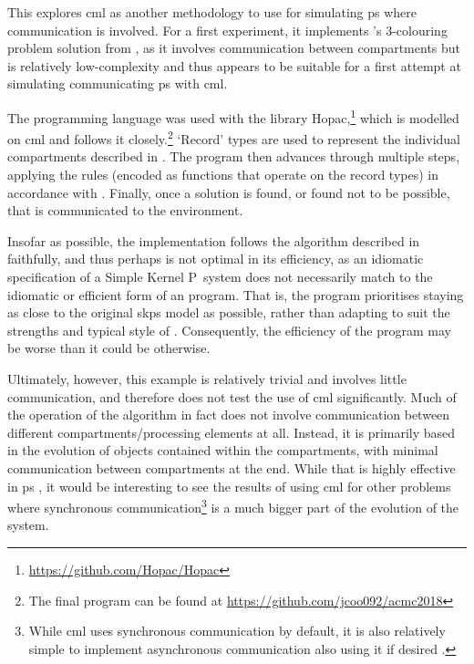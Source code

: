 
This  explores \gls{cml} as another methodology to use for simulating \gls{ps} where communication is involved.  For a first experiment, it implements \citeauthor{Gheorghe2013}'s 3-colouring problem solution from \cite{Gheorghe2013}, as it involves communication between compartments but is relatively low-complexity and thus appears to be suitable for a first attempt at simulating communicating \gls{ps} with \gls{cml}.

The programming language \fsharp{} was used with the library Hopac,\footnote{\url{https://github.com/Hopac/Hopac}} which is modelled on \gls{cml} and follows it closely.\footnote{The final program can be found at \url{https://github.com/jcoo092/acmc2018}}  `Record' types are used to represent the individual compartments described in \cite{Gheorghe2013}.  The program then advances through multiple steps, applying the rules (encoded as functions that operate on the record types) in accordance with \cite{Gheorghe2013}.  Finally, once a solution is found, or found not to be possible, that is communicated to the environment.

Insofar as possible, the implementation follows the algorithm described in \cite{Gheorghe2013} faithfully, and thus perhaps is not optimal in its efficiency, as an idiomatic specification of a Simple Kernel P~system does not necessarily match to the idiomatic or efficient form of an \fsharp{} program.  That is, the program prioritises staying as close to the original \gls{skps} model as possible, rather than adapting to suit the strengths and typical style of \fsharp{}.  Consequently, the efficiency of the program may be worse than it could be otherwise.

Ultimately, however, this example is relatively trivial and involves little communication, and therefore does not test the use of \gls{cml} significantly.  Much of the operation of the algorithm in fact does not involve communication between different compartments/processing elements at all.  Instead, it is primarily based in the evolution of objects contained within the compartments, with minimal communication between compartments at the end.  While that is highly effective in \gls{ps} \cite{Paun2008}, it would be interesting to see the results of using \gls{cml} for other problems where synchronous communication\footnote{While \gls{cml} uses synchronous communication by default, it is also relatively simple to implement asynchronous communication also using it if desired \cite{Reppy2007}.} is a much bigger part of the evolution of the system.


